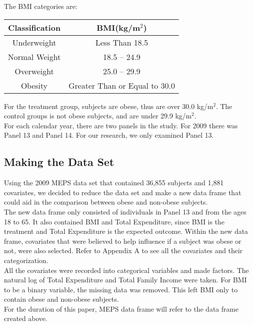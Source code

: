 \documentclass[11pt,twocolumn]{article}
\begin{document}
 
\noindent The BMI categories are:
\begin{center}
\begin{tabular}{|c|c|}
\hline
Classification&BMI(kg/m$^2$)\\ \hline
Underweight & Less Than 18.5\\ \hline
Normal Weight& 18.5 – 24.9 \\ \hline
Overweight& 25.0 – 29.9 \\\hline
Obesity & Greater Than or Equal to 30.0\\
\hline
\end{tabular}
\end{center}
 
\noindent For the treatment group, subjects are obese, thus are over 30.0 kg/m$^2$. The control groups is not obese subjects, and are under 29.9 kg/m$^2$.\\
\indent For each calendar year, there are two panels in the study. For 2009 there was Panel 13 and Panel 14. For our research, we only examined Panel 13.
 
\subsection{Making the Data Set}
Using the 2009 MEPS data set that contained 36,855 subjects and 1,881 covariates, we decided to reduce the data set and make a new data frame that could aid in the comparison between obese and non-obese subjects.\\
\indent The new data frame only consisted of individuals in Panel 13 and from the ages 18 to 65. It also contained BMI and Total Expenditure, since BMI is the treatment and Total Expenditure is the expected outcome. Within the new data frame, covariates that were believed to help influence if a subject was obese or not, were also selected. Refer to Appendix A to see all the covariates and their categorization.\\
\indent All the covariates were recorded into categorical variables and made factors. The natural log of Total Expenditure and Total Family Income were taken. For BMI to be a binary variable, the missing data was removed. This left BMI only to contain obese and non-obese subjects.\\
\indent For the duration of this paper, MEPS data frame will refer to the data frame created above.
 
\end{document}
